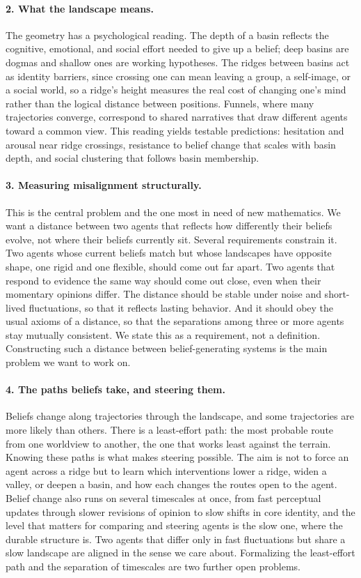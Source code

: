 \documentclass[11pt,a4paper]{article}
\begin{document}
\paragraph{2. What the landscape means.}
The geometry has a psychological reading. The depth of a basin reflects the
cognitive, emotional, and social effort needed to give up a belief; deep basins
are dogmas and shallow ones are working hypotheses. The ridges between basins
act as identity barriers, since crossing one can mean leaving a group, a
self-image, or a social world, so a ridge's height measures the real cost of
changing one's mind rather than the logical distance between positions. Funnels,
where many trajectories converge, correspond to shared narratives that draw
different agents toward a common view. This reading yields testable
predictions: hesitation and arousal near ridge crossings, resistance to belief
change that scales with basin depth, and social clustering that follows basin
membership.

\paragraph{3. Measuring misalignment structurally.}
This is the central problem and the one most in need of new mathematics. We
want a distance between two agents that reflects how differently their beliefs
evolve, not where their beliefs currently sit. Several requirements constrain
it. Two agents whose current beliefs match but whose landscapes have opposite
shape, one rigid and one flexible, should come out far apart. Two agents that
respond to evidence the same way should come out close, even when their
momentary opinions differ. The distance should be stable under noise and
short-lived fluctuations, so that it reflects lasting behavior. And it should
obey the usual axioms of a distance, so that the separations among three or
more agents stay mutually consistent. We state this as a requirement, not a
definition. Constructing such a distance between belief-generating systems is
the main problem we want to work on.

\paragraph{4. The paths beliefs take, and steering them.}
Beliefs change along trajectories through the landscape, and some trajectories
are more likely than others. There is a least-effort path: the most probable
route from one worldview to another, the one that works least against the
terrain. Knowing these paths is what makes steering possible. The aim is not to
force an agent across a ridge but to learn which interventions lower a ridge,
widen a valley, or deepen a basin, and how each changes the routes open to the
agent. Belief change also runs on several timescales at once, from fast
perceptual updates through slower revisions of opinion to slow shifts in core
identity, and the level that matters for comparing and steering agents is the
slow one, where the durable structure is. Two agents that differ only in fast
fluctuations but share a slow landscape are aligned in the sense we care about.
Formalizing the least-effort path and the separation of timescales are two
further open problems.
\end{document}
